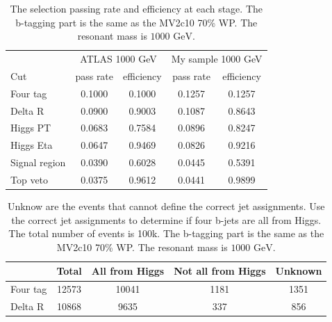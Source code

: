 \documentclass[12pt]{article}
\begin{document}
			\begin{table}[htpb]
				\centering
				\caption{The selection passing rate and efficiency at each stage. The b-tagging part is the same as the MV2c10 70\% WP. The resonant mass is $\text{1000 GeV}$.}
				\label{tab:signal_selection_efficiency_1000GeV_MV2c10}
				\begin{tabular}{l|cc|cc}
								  & \multicolumn{2}{|c|}{ATLAS 1000 GeV} & \multicolumn{2}{|c}{My sample 1000 GeV} \\
					Cut           & pass rate       & efficiency       & pass rate         & efficiency         \\ \hline
					Four tag      & 0.1000 & 0.1000 & 0.1257 & 0.1257 \\
					Delta R       & 0.0900 & 0.9003 & 0.1087 & 0.8643 \\
					Higgs PT      & 0.0683 & 0.7584 & 0.0896 & 0.8247 \\
					Higgs Eta     & 0.0647 & 0.9469 & 0.0826 & 0.9216 \\
					Signal region & 0.0390 & 0.6028 & 0.0445 & 0.5391 \\
					Top veto      & 0.0375 & 0.9612 & 0.0441 & 0.9899
				\end{tabular}
			\end{table}

			\begin{table}[htpb]
				\centering
				\caption{Unknow are the events that cannot define the correct jet assignments. Use the correct jet assignments to determine if four b-jets are all from Higgs. The total number of events is 100k. The b-tagging part is the same as the MV2c10 70\% WP. The resonant mass is $\text{1000 GeV}$.}
				\label{tab:signal_selection_compared_whit_truth_matching_1000GeV_MV2c10}
				\begin{tabular}{l|c|ccc}
							 & Total & All from Higgs & Not all from Higgs & Unknown \\ \hline
					Four tag & 12573 & 10041    & 1181  & 1351   \\
					Delta R  & 10868 & 9635    & 337   & 856    
				\end{tabular}
			\end{table}

		



\end{document}
